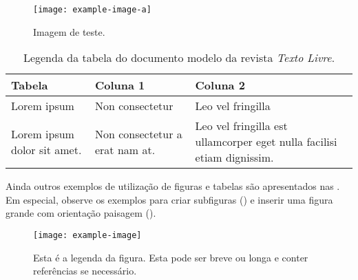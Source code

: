 \documentclass{textolivre}
\begin{document}
\begin{figure}[htbp]
 \centering
 \texttt{[image: example-image-a]}
 \caption{Imagem de teste.}
 \label{fig-img-a}
\end{figure}

\lipsum[12]

\begin{table}[htpb]
\caption{Legenda da tabela do documento modelo da revista \textit{Texto Livre}.}
\label{tbl-tabela-01}
\begin{tabular}{llp{4.3cm}}
\toprule 
Tabela                      & Coluna 1                       & Coluna 2                                                               \\ 
\midrule
Lorem ipsum                 & Non consectetur                & Leo vel fringilla                                                      \\ 
\midrule
Lorem ipsum dolor sit amet. & Non consectetur a erat nam at. & Leo vel fringilla est ullamcorper eget nulla facilisi etiam dignissim. \\ 
\bottomrule
\end{tabular}
\end{table}

\lipsum[3]

Ainda outros exemplos de utilização de figuras e tabelas são apresentados nas . Em especial, observe os exemplos para criar subfiguras () e inserir uma figura grande com orientação paisagem ().

\begin{figure}[htbp]
\centering
\texttt{[image: example-image]}
\caption{Esta é a legenda da figura. Esta pode ser breve ou longa e conter referências se necessário.}
\label{fig:example}
\end{figure}

\lipsum[30-35]
\end{document}
